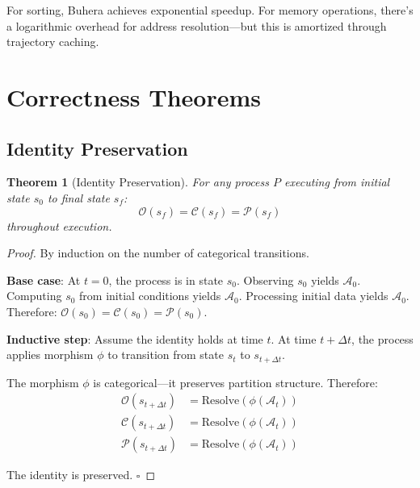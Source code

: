 \documentclass[twocolumn,10pt]{article}
\newtheorem{theorem}{Theorem}[section]
\theoremstyle{definition}
\theoremstyle{remark}
\newcommand{\cataddr}{\mathcal{A}}
\begin{document}
For sorting, Buhera achieves exponential speedup. For memory operations, there's a logarithmic overhead for address resolution—but this is amortized through trajectory caching.

\section{Correctness Theorems}
\label{sec:correctness}

\subsection{Identity Preservation}

\begin{theorem}[Identity Preservation]
For any process $P$ executing from initial state $s_0$ to final state $s_f$:
\begin{equation}
    \mathcal{O}(s_f) = \mathcal{C}(s_f) = \mathcal{P}(s_f)
\end{equation}
throughout execution.
\end{theorem}

\begin{proof}
By induction on the number of categorical transitions.

\textbf{Base case}: At $t=0$, the process is in state $s_0$. Observing $s_0$ yields $\cataddr_0$. Computing $s_0$ from initial conditions yields $\cataddr_0$. Processing initial data yields $\cataddr_0$. Therefore: $\mathcal{O}(s_0) = \mathcal{C}(s_0) = \mathcal{P}(s_0)$.

\textbf{Inductive step}: Assume the identity holds at time $t$. At time $t + \Delta t$, the process applies morphism $\phi$ to transition from state $s_t$ to $s_{t+\Delta t}$.

The morphism $\phi$ is categorical—it preserves partition structure. Therefore:
\begin{align}
    \mathcal{O}(s_{t+\Delta t}) &= \text{Resolve}(\phi(\cataddr_t)) \\
    \mathcal{C}(s_{t+\Delta t}) &= \text{Resolve}(\phi(\cataddr_t)) \\
    \mathcal{P}(s_{t+\Delta t}) &= \text{Resolve}(\phi(\cataddr_t))
\end{align}

The identity is preserved. $\square$
\end{proof}
\end{document}

